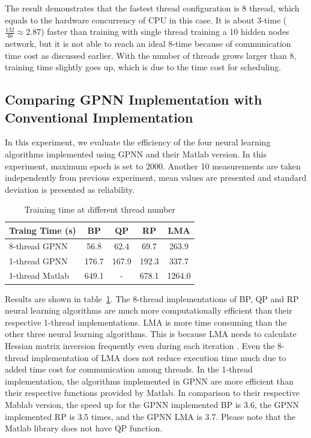 \documentclass[procedia]{easychair}
\begin{document}
The result demonstrates that the fastest thread configuration is 8 thread, which equals to the hardware concurrency of CPU in this case.  It is about 3-time ($ \frac{132}{46} \approx 2.87 $) faster than training with single thread training a 10 hidden nodes network, but it is not able to reach an ideal 8-time because of communication time cost as discussed earlier.  With the number of threads grows larger than 8, training time slightly goes up, which is due to the time cost for scheduling.

\subsection{Comparing GPNN Implementation with Conventional Implementation}

In this experiment, we evaluate the efficiency of the four neural learning algorithms implemented using GPNN and their Matlab version.  In this experiment, maximum epoch is set to 2000.  Another 10 measurements are taken independently from previous experiment, mean values are presented and standard deviation is presented as reliability.

\begin{table}[htp]
    \centering
    \caption{Training time at different thread number}
    \begin{tabular}{ l c c c c }
        \hline \hline
        Traing Time (s) & BP & QP & RP & LMA \\
        \hline
        8-thread GPNN & 56.8 & 62.4 & 69.7 & 263.9 \\
        1-thread GPNN & 176.7 & 167.9 & 192.3 & 337.7 \\
        1-thread Matlab & 649.1 & - & 678.1 & 1264.0 \\
        \hline \hline
    \end{tabular}
    \label{table:algorithm_complexity}
\end{table}

Results are shown in table~\ref{table:algorithm_complexity}.  The 8-thread implementations of BP, QP and  RP neural learning algorithms are much more computationally efficient than their respective 1-thread implementations.  LMA is more time consuming than the other three neural learning algorithms.  This is because LMA needs to calculate Hessian matrix inversion frequently even during each iteration \cite{yu2011levenberg}.  Even the 8-thread implementation of LMA does not reduce execution time much due to added time cost for communication among threads.  In the 1-thread implementation, the algorithms implemented in GPNN are more efficient than their respective functions provided by Matlab.  In comparison to their respective Mablab version, the speed up for the GPNN implemented BP is 3.6, the GPNN implemented RP is 3.5 times, and the GPNN LMA is 3.7.  Please note that the Matlab library does not have QP function.
\end{document}
